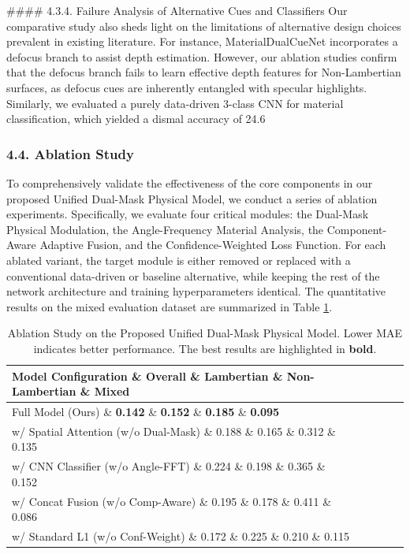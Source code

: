 \documentclass[journal]{IEEEtran}
\begin{document}
\#\#\#\# 4.3.4. Failure Analysis of Alternative Cues and Classifiers
Our comparative study also sheds light on the limitations of alternative design choices prevalent in existing literature. For instance, MaterialDualCueNet incorporates a defocus branch to assist depth estimation. However, our ablation studies confirm that the defocus branch fails to learn effective depth features for Non-Lambertian surfaces, as defocus cues are inherently entangled with specular highlights. Similarly, we evaluated a purely data-driven 3-class CNN for material classification, which yielded a dismal accuracy of 24.6\\%

\subsubsection{4.4. Ablation Study}

To comprehensively validate the effectiveness of the core components in our proposed Unified Dual-Mask Physical Model, we conduct a series of ablation experiments. Specifically, we evaluate four critical modules: the Dual-Mask Physical Modulation, the Angle-Frequency Material Analysis, the Component-Aware Adaptive Fusion, and the Confidence-Weighted Loss Function. For each ablated variant, the target module is either removed or replaced with a conventional data-driven or baseline alternative, while keeping the rest of the network architecture and training hyperparameters identical. The quantitative results on the mixed evaluation dataset are summarized in Table \ref{tab:ablation}.

\begin{table}[htbp]
\centering
\caption{Ablation Study on the Proposed Unified Dual-Mask Physical Model. Lower MAE indicates better performance. The best results are highlighted in \textbf{bold}.}
\label{tab:ablation}
\renewcommand{\arraystretch}{1.25}
\begin{tabular}{lcccc}
\toprule
\textbf{Model Configuration} \& \textbf{Overall} \& \textbf{Lambertian} \& \textbf{Non-Lambertian} \& \textbf{Mixed} \\
\midrule
Full Model (Ours) \& \textbf{0.142} \& \textbf{0.152} \& \textbf{0.185} \& \textbf{0.095} \\
w/ Spatial Attention (w/o Dual-Mask) \& 0.188 \& 0.165 \& 0.312 \& 0.135 \\
w/ CNN Classifier (w/o Angle-FFT) \& 0.224 \& 0.198 \& 0.365 \& 0.152 \\
w/ Concat Fusion (w/o Comp-Aware) \& 0.195 \& 0.178 \& 0.411 \& 0.086 \\
w/ Standard L1 (w/o Conf-Weight) \& 0.172 \& 0.225 \& 0.210 \& 0.115 \\
\bottomrule
\end{tabular}
\end{table}
\end{document}
